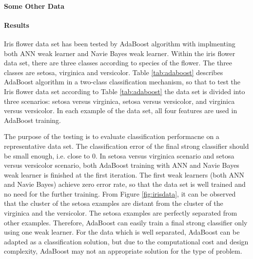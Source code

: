 \paragraph{Some Other Data}
\paragraph{Results}
Iris flower data set has been tested by AdaBoost algorithm with implmenting both ANN weak learner and Navie Bayes weak learner. Within the iris flower data set, there are three classes according to species of the flower. The three classes are setosa, virginica and versicolor. \mbox{Table} \ref{tab:adaboost} describes AdaBoost algorithm in a two-class classification mechanism, so that to test the Iris flower data set according to \mbox{Table} \ref{tab:adaboost} the data set is divided into three scenarios: setosa versus virginica, setosa versus versicolor, and virginica versus versicolor. In each example of the data set, all four features are used in AdaBoost training. 

The purpose of the testing is to evaluate classification performacne on a representative data set. The classification error of the final strong classifier should be small enough, i.e. close to $0$. In setosa versus virginica scenario and setosa versus versicolor scenario, both AdaBoost training with ANN and Navie Bayes weak learner is finished at the first iteration. The first weak learners (both ANN and Navie Bayes) achieve zero error rate, so that the data set is well trained and no need for the further training. From \mbox{Figure} \ref{fig:irisdata}, it can be observed that the cluster of the setosa examples are distant from the cluster of the virginica and the versicolor. The setosa examples are perfectly separated from other examples. Therefore, AdaBoost can easily train a final strong classifier only using one weak learner. For the data which is well separated, AdaBoost can be adapted as a classification solution, but due to the computational cost and design complexity, AdaBoost may not an appropriate solution for the type of problem.

